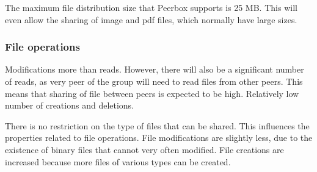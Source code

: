 The maximum file distribution size that Peerbox supports is 25 MB. This will even allow the sharing of image and pdf files, which normally have large sizes.

\subsubsection{File operations}

Modifications more than reads. However, there will also be a significant number of reads, as very peer of the group will need to read files from other peers. This means that sharing of file between peers is expected to be high. Relatively low number of creations and deletions.

There is no restriction on the type of files that can be shared. This influences the properties related to file operations. File modifications are slightly less, due to the existence of binary files that cannot very often modified. File creations are increased because more files of various types can be created.